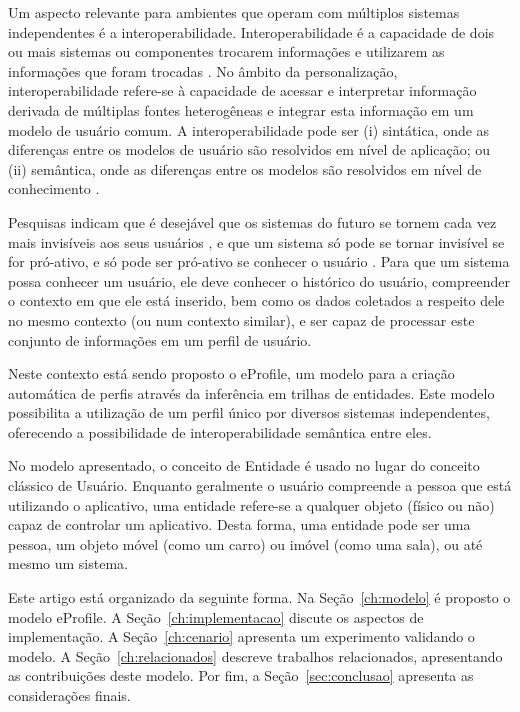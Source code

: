 \documentclass[times, 10pt, twocolumn]{article}
\begin{document}
Um aspecto relevante para ambientes que operam com múltiplos sistemas independentes é a interoperabilidade. Interoperabilidade é a capacidade de dois ou mais sistemas ou componentes trocarem informações e utilizarem as informações que foram trocadas \cite{ieeedict}. No âmbito da personalização, interoperabilidade refere-se à capacidade de acessar e interpretar informação derivada de múltiplas fontes heterogêneas e integrar esta informação em um modelo de usuário comum. A interoperabilidade pode ser (i) sintática, onde as diferenças entre os modelos de usuário são resolvidos em nível de aplicação; ou (ii) semântica, onde as diferenças entre os modelos são resolvidos em nível de conhecimento \cite{carmagnola09}.

Pesquisas indicam que é desejável que os sistemas do futuro se tornem cada vez mais invisíveis aos seus usuários \cite{weiser96}, e que um sistema só pode se tornar invisível se for pró-ativo, e só pode ser pró-ativo se conhecer o usuário \cite{satyanarayanan01}. Para que um sistema possa conhecer um usuário, ele deve conhecer o histórico do usuário, compreender o contexto em que ele está inserido, bem como os dados coletados a respeito dele no mesmo contexto (ou num contexto similar), e ser capaz de processar este conjunto de informações em um perfil de usuário.

Neste contexto está sendo proposto o eProfile, um modelo para a criação automática de perfis através da inferência em trilhas de entidades. Este modelo possibilita a utilização de um perfil único por diversos sistemas independentes, oferecendo a possibilidade de interoperabilidade semântica entre eles.

No modelo apresentado, o conceito de Entidade é usado no lugar do conceito clássico de Usuário. Enquanto geralmente o usuário compreende a pessoa que está utilizando o aplicativo, uma entidade refere-se a qualquer objeto (físico ou não) capaz de controlar um aplicativo. Desta forma, uma entidade pode ser uma pessoa, um objeto móvel (como um carro) ou imóvel (como uma sala), ou até mesmo um sistema.

Este artigo está organizado da seguinte forma. Na Seção~\ref{ch:modelo} é proposto o modelo eProfile. A Seção~\ref{ch:implementacao} discute os aspectos de implementação. A Seção~\ref{ch:cenario} apresenta um experimento validando o modelo. A Seção~\ref{ch:relacionados} descreve trabalhos relacionados, apresentando as contribuições deste modelo. Por fim, a Seção~\ref{sec:conclusao} apresenta as considerações finais.
\end{document}
